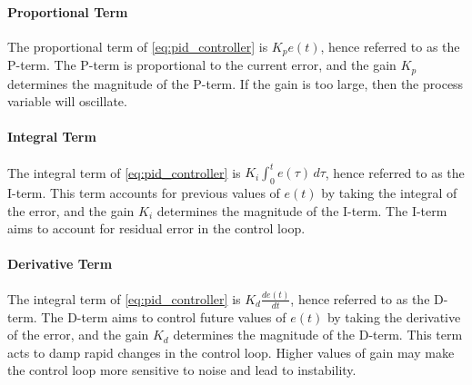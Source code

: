 \paragraph{Proportional Term} The proportional term of \autoref{eq:pid_controller} is $K_pe(t)$, hence referred to as the P-term. The P-term is proportional to the current error, and the gain $K_p$ determines the magnitude of the P-term. If the gain is too large, then the process variable will oscillate.

\paragraph{Integral Term} The integral term of \autoref{eq:pid_controller} is $K_i\int_{0}^{t}e(\tau) \, d\tau$, hence referred to as the I-term. This term accounts for previous values of $e(t)$ by taking the integral of the error, and the gain $K_i$ determines the magnitude of the I-term. The I-term aims to account for residual error in the control loop.

\paragraph{Derivative Term} The integral term of \autoref{eq:pid_controller} is $K_d\frac{de(t)}{dt}$, hence referred to as the D-term. The D-term aims to control future values of $e(t)$ by taking the derivative of the error, and the gain $K_d$ determines the magnitude of the D-term. This term acts to damp rapid changes in the control loop. Higher values of gain may make the control loop more sensitive to noise and lead to instability.